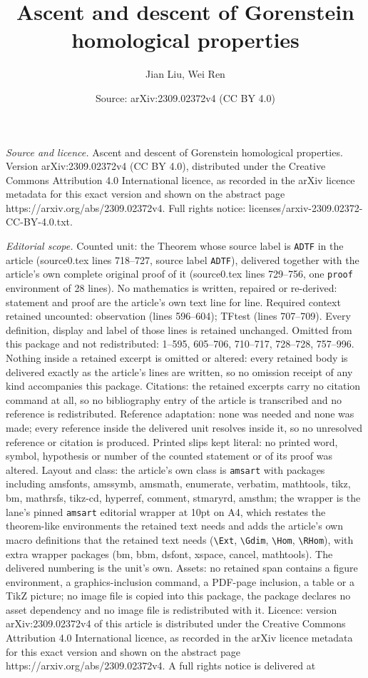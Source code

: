 \documentclass[10pt,a4paper]{amsart}
\title[Ascent and descent of Gorenstein homological properties]{Ascent and descent of Gorenstein homological properties}
\author{Jian Liu, Wei Ren}
\date{Source: arXiv:2309.02372v4 (CC BY 4.0)}
\begin{document}
\maketitle

\noindent\emph{Source and licence.} Ascent and descent of Gorenstein homological properties. Version arXiv:2309.02372v4 (CC BY 4.0), distributed under the Creative Commons Attribution 4.0 International licence, as recorded in the arXiv licence metadata for this exact version and shown on the abstract page https://arxiv.org/abs/2309.02372v4. Full rights notice: licenses/arxiv-2309.02372-CC-BY-4.0.txt.\par\smallskip

\noindent\textit{Editorial scope.} Counted unit: the Theorem whose source label is \texttt{ADTF} in the article (source0.tex lines 718--727, source label \texttt{ADTF}), delivered together with the article's own complete original proof of it (source0.tex lines 729--756, one \texttt{proof} environment of 28 lines). No mathematics is written, repaired or re-derived: statement and proof are the article's own text line for line. Required context retained uncounted: observation (lines 596--604); TFtest (lines 707--709). Every definition, display and label of those lines is retained unchanged. Omitted from this package and not redistributed: 1--595, 605--706, 710--717, 728--728, 757--996. Nothing inside a retained excerpt is omitted or altered: every retained body is delivered exactly as the article's lines are written, so no omission receipt of any kind accompanies this package. Citations: the retained excerpts carry no citation command at all, so no bibliography entry of the article is transcribed and no reference is redistributed. Reference adaptation: none was needed and none was made; every reference inside the delivered unit resolves inside it, so no unresolved reference or citation is produced. Printed slips kept literal: no printed word, symbol, hypothesis or number of the counted statement or of its proof was altered. Layout and class: the article's own class is \texttt{amsart} with packages including amsfonts, amssymb, amsmath, enumerate, verbatim, mathtools, tikz, bm, mathrsfs, tikz-cd, hyperref, comment, stmaryrd, amsthm; the wrapper is the lane's pinned \texttt{amsart} editorial wrapper at 10pt on A4, which restates the theorem-like environments the retained text needs and adds the article's own macro definitions that the retained text needs (\texttt{\textbackslash Ext}, \texttt{\textbackslash Gdim}, \texttt{\textbackslash Hom}, \texttt{\textbackslash RHom}), with extra wrapper packages (bm, bbm, dsfont, xspace, cancel, mathtools). The delivered numbering is the unit's own. Assets: no retained span contains a figure environment, a graphics-inclusion command, a PDF-page inclusion, a table or a TikZ picture; no image file is copied into this package, the package declares no asset dependency and no image file is redistributed with it. Licence: version arXiv:2309.02372v4 of this article is distributed under the Creative Commons Attribution 4.0 International licence, as recorded in the arXiv licence metadata for this exact version and shown on the abstract page https://arxiv.org/abs/2309.02372v4. A full rights notice is delivered at 
\end{document}
